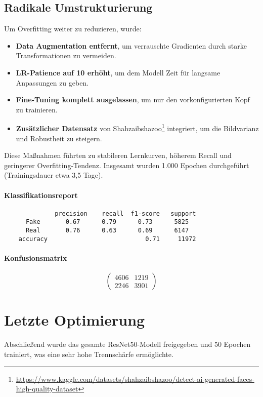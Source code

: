 \subsection{Radikale Umstrukturierung}
Um Overfitting weiter zu reduzieren, wurde:
\begin{itemize}
  \item \textbf{Data Augmentation entfernt}, um verrauschte Gradienten durch starke Transformationen zu vermeiden.
  \item \textbf{LR-Patience auf 10 erhöht}, um dem Modell Zeit für langsame Anpassungen zu geben.
  \item \textbf{Fine-Tuning komplett ausgelassen}, um nur den vorkonfigurierten Kopf zu trainieren.
  \item \textbf{Zusätzlicher Datensatz} von Shahzaibshazoo\footnote{\url{https://www.kaggle.com/datasets/shahzaibshazoo/detect-ai-generated-faces-high-quality-dataset}} integriert, um die Bildvarianz und Robustheit zu steigern.
\end{itemize}
Diese Maßnahmen führten zu stabileren Lernkurven, höherem Recall und geringerer Overfitting-Tendenz. Insgesamt wurden 1.000 Epochen durchgeführt (Trainingsdauer etwa 3,5 Tage).

\paragraph{Klassifikationsreport}
\begin{verbatim}
              precision    recall  f1-score   support
      Fake       0.67      0.79      0.73      5825
      Real       0.76      0.63      0.69      6147
    accuracy                           0.71     11972
\end{verbatim}

\paragraph{Konfusionsmatrix}
\[
\begin{pmatrix}
4606 & 1219\\
2246 & 3901
\end{pmatrix}
\]

\section{Letzte Optimierung}
Abschließend wurde das gesamte ResNet50-Modell freigegeben und 50 Epochen trainiert, was eine sehr hohe Trennschärfe ermöglichte.

